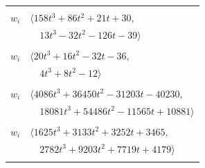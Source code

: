 \documentclass[11pt]{article}
\begin{document}
\begin{longtable}{@{}ll@{}}
\addlinespace[2pt]
\multicolumn{2}{@{}p{0.97\textwidth}@{}}{$i=14$, $D_i=4$, $\rho_{ij}$: $5{:}1, \allowbreak 8{:}1, \allowbreak 17{:}1, \allowbreak 19{:}1, \allowbreak 24{:}2, \allowbreak 26{:}2, \allowbreak 31{:}2, \allowbreak 32{:}2, \allowbreak 43{:}1, \allowbreak 44{:}1, \allowbreak 45{:}1, \allowbreak 51{:}1, \allowbreak 64{:}1, \allowbreak 67{:}1, \allowbreak 68{:}1$}\\
$w_i$ & $\langle 158t^{3}+86t^{2}+21t+30,$\\
 & $\quad 13t^{3}-32t^{2}-126t-39\rangle$\\
\addlinespace[2pt]
\multicolumn{2}{@{}p{0.97\textwidth}@{}}{$i=15$, $D_i=2$, $\rho_{ij}$: $4{:}2, \allowbreak 7{:}2, \allowbreak 8{:}1, \allowbreak 9{:}2, \allowbreak 22{:}1, \allowbreak 28{:}1, \allowbreak 41{:}1, \allowbreak 42{:}1, \allowbreak 48{:}1, \allowbreak 52{:}2, \allowbreak 64{:}2$}\\
$w_i$ & $\langle 20t^{3}+16t^{2}-32t-36,$\\
 & $\quad 4t^{3}+8t^{2}-12\rangle$\\
\addlinespace[2pt]
\multicolumn{2}{@{}p{0.97\textwidth}@{}}{$i=16$, $D_i=128$, $\rho_{ij}$: $11{:}2, \allowbreak 21{:}1, \allowbreak 22{:}2, \allowbreak 24{:}1, \allowbreak 29{:}2, \allowbreak 30{:}1, \allowbreak 31{:}1, \allowbreak 36{:}2, \allowbreak 38{:}2, \allowbreak 39{:}2, \allowbreak 40{:}1, \allowbreak 47{:}2, \allowbreak 50{:}1, \allowbreak 61{:}1, \allowbreak 62{:}2, \allowbreak 63{:}2, \allowbreak 64{:}1, \allowbreak 66{:}2, \allowbreak 68{:}1$}\\
$w_i$ & $\langle 4086t^{3}+36450t^{2}-31203t-40230,$\\
 & $\quad 18081t^{3}+54486t^{2}-11565t+10881\rangle$\\
\addlinespace[2pt]
\multicolumn{2}{@{}p{0.97\textwidth}@{}}{$i=17$, $D_i=64$, $\rho_{ij}$: $1{:}2, \allowbreak 4{:}2, \allowbreak 6{:}1, \allowbreak 8{:}2, \allowbreak 14{:}2, \allowbreak 23{:}1, \allowbreak 25{:}2, \allowbreak 27{:}1, \allowbreak 37{:}1, \allowbreak 38{:}2, \allowbreak 47{:}2, \allowbreak 49{:}1, \allowbreak 51{:}2, \allowbreak 60{:}1, \allowbreak 64{:}1$}\\
$w_i$ & $\langle 1625t^{3}+3133t^{2}+3252t+3465,$\\
 & $\quad 2782t^{3}+9203t^{2}+7719t+4179\rangle$\\
\addlinespace[2pt]
\multicolumn{2}{@{}p{0.97\textwidth}@{}}{$i=18$, $D_i=1$, $\rho_{ij}$: $2{:}2, \allowbreak 10{:}1, \allowbreak 47{:}1, \allowbreak 61{:}2, \allowbreak 62{:}1, \allowbreak 63{:}2$}\\

\end{longtable}
\end{document}
